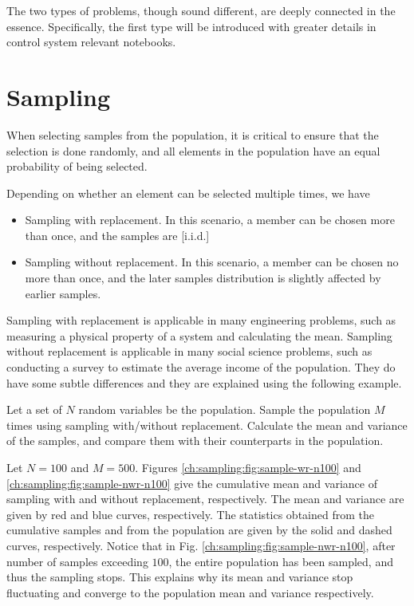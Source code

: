 The two types of problems, though sound different, are deeply connected in the essence. Specifically, the first type will be introduced with greater details in control system relevant notebooks.

\section{Sampling}

When selecting samples from the population, it is critical to ensure that the selection is done randomly, and all elements in the population have an equal probability of being selected. 

Depending on whether an element can be selected multiple times, we have
\begin{itemize}
  \item Sampling with replacement. In this scenario, a member can be chosen more than once, and the samples are [i.i.d.]
  \item Sampling without replacement. In this scenario, a member can be chosen no more than once, and the later samples distribution is slightly affected by earlier samples.
\end{itemize}
Sampling with replacement is applicable in many engineering problems, such as measuring a physical property of a system and calculating the mean. Sampling without replacement is applicable in many social science problems, such as conducting a survey to estimate the average income of the population. They do have some subtle differences and they are explained using the following example.

Let a set of $N$ random variables be the population. Sample the population $M$ times using sampling with/without replacement. Calculate the mean and variance of the samples, and compare them with their counterparts in the population.

Let $N=100$ and $M=500$. Figures \ref{ch:sampling:fig:sample-wr-n100} and \ref{ch:sampling:fig:sample-nwr-n100} give the cumulative mean and variance of sampling with and without replacement, respectively. The mean and variance are given by red and blue curves, respectively. The statistics obtained from the cumulative samples and from the population are given by the solid and dashed curves, respectively. Notice that in Fig. \ref{ch:sampling:fig:sample-nwr-n100}, after number of samples exceeding $100$, the entire population has been sampled, and thus the sampling stops. This explains why its mean and variance stop fluctuating and converge to the population mean and variance respectively.

